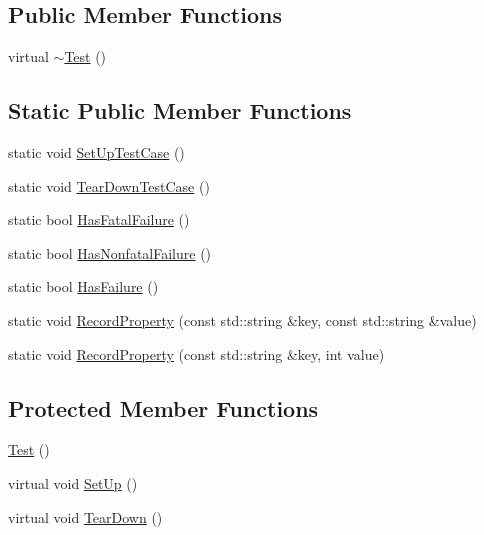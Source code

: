 \subsection*{Public Member Functions}
\begin{DoxyCompactItemize}
\item 
virtual \hyperlink{classtesting_1_1_test_a2b0a62f1e667bbe8d8cb18d785bfa991}{$\sim$\+Test} ()
\end{DoxyCompactItemize}
\subsection*{Static Public Member Functions}
\begin{DoxyCompactItemize}
\item 
static void \hyperlink{classtesting_1_1_test_a5ccbac42fee8c5b00b0bfe89b6c49d79}{Set\+Up\+Test\+Case} ()
\item 
static void \hyperlink{classtesting_1_1_test_af374706cbaf0ffc460f4fd04e7c150f1}{Tear\+Down\+Test\+Case} ()
\item 
static bool \hyperlink{classtesting_1_1_test_a5e83604628ef542af888d631566ff60c}{Has\+Fatal\+Failure} ()
\item 
static bool \hyperlink{classtesting_1_1_test_a8c00e8cc6fe10616b480bd54d2a426cb}{Has\+Nonfatal\+Failure} ()
\item 
static bool \hyperlink{classtesting_1_1_test_a7a00be7dd0a6bfdc8d47a1b784623613}{Has\+Failure} ()
\item 
static void \hyperlink{classtesting_1_1_test_a1559ce1c83f56993b582650c091535a7}{Record\+Property} (const std\+::string \&key, const std\+::string \&value)
\item 
static void \hyperlink{classtesting_1_1_test_a373da47b491b1e64e355d22d6ec99b5b}{Record\+Property} (const std\+::string \&key, int value)
\end{DoxyCompactItemize}
\subsection*{Protected Member Functions}
\begin{DoxyCompactItemize}
\item 
\hyperlink{classtesting_1_1_test_a99f2bbfac6c95612322b0f10e607ebe5}{Test} ()
\item 
virtual void \hyperlink{classtesting_1_1_test_a190315150c303ddf801313fd1a777733}{Set\+Up} ()
\item 
virtual void \hyperlink{classtesting_1_1_test_a5f0ab439802cbe0ef7552f1a9f791923}{Tear\+Down} ()
\end{DoxyCompactItemize}
